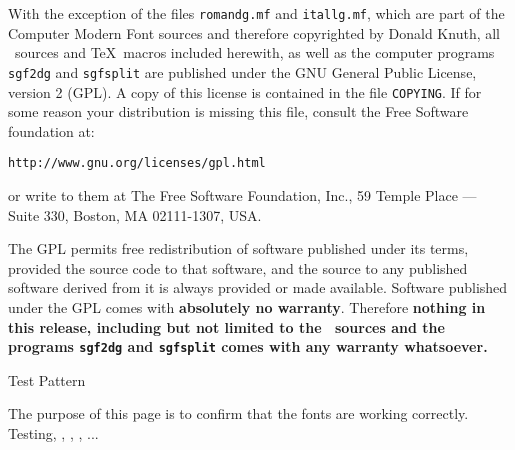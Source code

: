 With the exception of the files {\tt romandg.mf} and {\tt itallg.mf}, 
which are part of the Computer Modern Font sources and therefore copyrighted
by Donald Knuth, all \metafont\ sources and \TeX\ macros included herewith, as
well as the computer programs {\tt sgf2dg} and {\tt sgfsplit} are
published under the GNU General Public License, version 2 (GPL). 
A copy of this license is contained in the file {\tt COPYING}. If for some
reason your distribution is missing this file, consult the Free Software
foundation at:
\smallskip
\centerline{\tt http://www.gnu.org/licenses/gpl.html}
\smallskip\noindent
or write to them at The Free Software Foundation, Inc., 59 Temple Place ---
Suite 330, Boston, MA 02111-1307, USA.

The GPL permits free redistribution of software published under its terms,
provided the source code to that software, and the source to any published
software derived from it is always provided or made available. Software
published under the GPL comes with {\bf absolutely no warranty}. Therefore
{\bf nothing in this release, including but not limited to the \metafont\
sources and the programs {\tt sgf2dg} and {\tt sgfsplit} comes with any
warranty whatsoever.}

\vfil\eject
\bigbreak
\centerline{\titlefont Test Pattern}
\bigbreak

The purpose of this page is to confirm that the fonts are working
correctly. Testing, \textstone{\goo\001=}, \textstone{\goo\002=}, 
\textstone{\goo\003=}, ...

